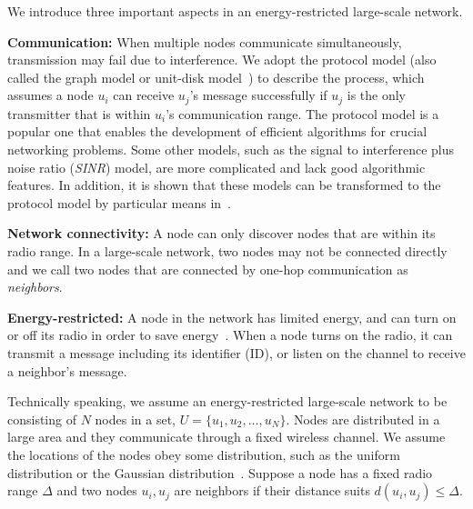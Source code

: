 We introduce three important aspects in an energy-restricted large-scale
network.

\textbf{Communication:}
When multiple nodes communicate simultaneously, transmission may fail
due to interference. We adopt the protocol model
(also called the graph model or unit-disk model~\cite{moscibroda2006complexity,
wang2015connectivity}) to describe the process, which assumes a node
$u_i$ can receive $u_j$'s message successfully if $u_j$ is the only
transmitter that is within $u_i$'s communication range.
The protocol model is a popular one that enables the development of
efficient algorithms for crucial networking problems. Some other models,
such as the signal to interference plus noise ratio (\emph{SINR}) model,
are more complicated and lack good algorithmic features. %
In addition, it
is shown that these models can be transformed to the protocol model by
particular means in~\cite{halldorsson2015well}.

\textbf{Network connectivity:}
A node can only discover nodes that are within its radio range. %
In a large-scale network, two nodes may not be connected
directly and we call two nodes that are connected by one-hop communication as
\emph{neighbors}.

\textbf{Energy-restricted:}
A node in the network has limited energy, and can turn on or off its
radio in order to save energy~\cite{dunkels2011contikimac, zhang2017performance}.
When a node turns on the radio, it can transmit a message including its
identifier (ID), or listen on the channel to receive a neighbor's
message.

Technically speaking, we assume an energy-restricted large-scale network
to be consisting of $N$ nodes in a set, $U=\{u_1,u_2,\ldots,u_N\}$.  Nodes are
distributed in a large area and they communicate through a fixed
wireless channel. We assume the locations of the nodes obey some
distribution, such as the uniform distribution or the Gaussian
distribution~\cite{wang2013gaussian}.
Suppose a node has a fixed radio range $\Delta$ and two nodes
$u_i, u_j$ are neighbors if their distance suits $d(u_i, u_j) \leq
\Delta$. 

